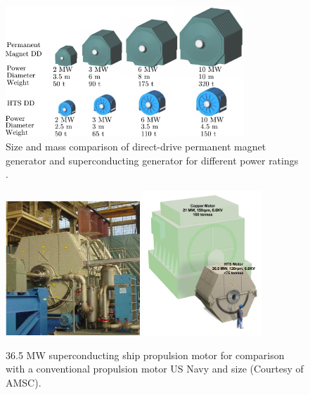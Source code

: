 \documentclass[a4paper, 11pt]{article} %
\begin{document}
  \begin{figure}[t]
    \centering
    \includegraphics[width=0.8\textwidth]{amsc_ddpm_hts_comparison}
  	\caption{Size and mass comparison of direct-drive permanent magnet generator and superconducting generator for different power ratings \cite{amsc_presentation}.} 
  	\label{ddpm_hts_compare}
  \end{figure}


  \begin{figure}[t]
    \centering
    \includegraphics[width=0.45\textwidth]{36MW_AMSC}
    \includegraphics[width=0.4\textwidth]{amsc_36mw_compare}
    \caption{36.5 MW superconducting ship propulsion motor for comparison with a conventional propulsion motor US Navy and size  (Courtesy of AMSC).} 
    \label{amsc_36mw}
  \end{figure}
\end{document}
